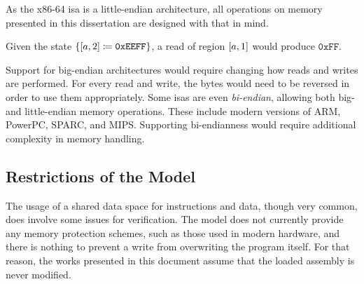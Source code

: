
As the x86-64 \ac{isa} is a little-endian architecture,%
all operations on memory presented in this dissertation are designed with that in mind.
\begin{example}
  Given the state $\{[a,2]\coloneqq\mathtt{0xEEFF}\}$,
  a read of region $[a,1]$ would produce $\mathtt{0xFF}$.
\end{example}
Support for big-endian architectures would require changing how reads and writes%
are performed. For every read and write, the bytes would need to be reversed
in order to use them appropriately.
Some \acp{isa} are even \emph{bi-endian}, allowing both big- and little-endian%
memory operations. These include modern versions of ARM, PowerPC, SPARC, and MIPS.
Supporting bi-endianness would require additional complexity in memory handling.

\subsection{Restrictions of the Model}
The usage of a shared data space for instructions and data, though very common,
does involve some issues for verification.
The model does not currently provide any memory protection schemes,%
such as those used in modern hardware,
and there is nothing to prevent a write from overwriting the program itself.
For that reason,
the works presented in this document assume that the loaded assembly is never modified.

